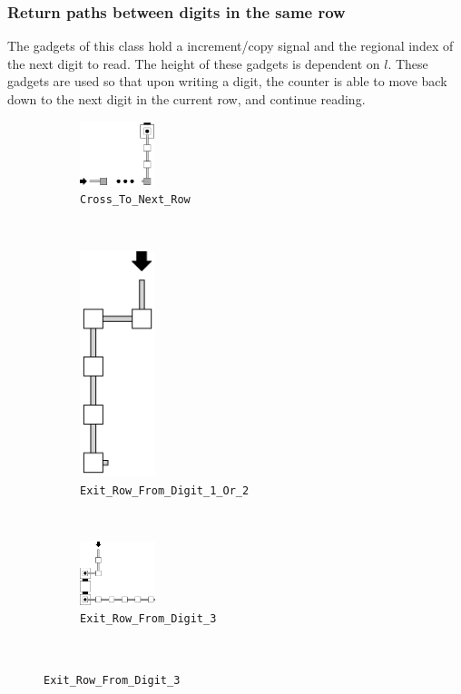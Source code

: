 \subsubsection{Return paths between digits in the same row}
The gadgets of this class hold a increment/copy signal and the regional index
of the next digit to read. The height of these gadgets is dependent on $l$.
These gadgets are used so that upon writing a digit, the counter is able to
move back down to the next digit in the current row, and continue reading.
\vspace{1cm}

\begin{figure}[H]
    \centering
    \begin{subfigure}[t]{0.32\textwidth}
        \centering
        \includegraphics[width=0.24\textwidth]{cross_to_next_row}
        \caption{\label{fig:cross_to_next_row} {\tt Cross\_To\_Next\_Row}}
    \end{subfigure}%
    ~
    \begin{subfigure}[t]{0.32\textwidth}
        \centering
        \includegraphics[width=0.24\textwidth]{exit_row_from_digit_1_or_digit_2}
        \caption{\label{fig:exit_row_from_digit_1_or_digit_2} {\tt Exit\_Row\_From\_Digit\_1\_Or\_2} }
    \end{subfigure}%
    ~
    \begin{subfigure}[t]{0.32\textwidth}
        \centering
        \includegraphics[width=0.24\textwidth]{exit_row_from_digit_3}
        \caption{\label{fig:exit_row_from_digit_3} {\tt Exit\_Row\_From\_Digit\_3}}
    \end{subfigure}%
    ~
\end{figure}



